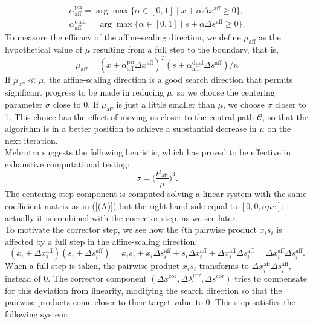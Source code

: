 \documentclass[a4paper,10 pt,titlepage,twoside]{book}
\theoremstyle{plain}
\theoremstyle{definition}
\theoremstyle{remark}
\begin{document}
\begin{align}\label{Qw}\tag{4.22a}
\alpha_{\text{aff}}^{\text{pri}}=\arg\max\{\alpha\in[0,1]\;|\;x +\alpha\Delta x^{\text{aff}}\geq 0\}, \\
\alpha_{\text{aff}}^{\text{dual}}=\arg\max\{\alpha\in[0,1]\;|\;s +\alpha\Delta s^{\text{aff}}\geq 0\}\tag{4.22b}.
\end{align}
To measure the efficacy of the affine-scaling direction, we define $\mu_{\text{aff}}$ as the hypothetical value of $\mu$ resulting from a full step to the boundary, that is,
\begin{equation}\tag{4.22c}
	\mu_{\text{aff}}= (x+\alpha_{\text{aff}}^{\text{pri}}\Delta x^{\text{aff}})^{T}(s+\alpha_{\text{aff}}^{\text{dual}}\Delta s^{\text{aff}})/n
\end{equation}
If $\mu_{\text{aff}}\ll\mu$, the affine-scaling direction is a good search direction that permits significant progress to be made in reducing $\mu$, so we choose the centering parameter $\sigma$ close to 0. If $\mu_{\text{aff}}$ is just a little smaller than $\mu$, we choose $\sigma$ closer to 1. This choice has the effect of moving us closer  to the central path $\mathcal{C}$, so that the algorithm is in a better position to achieve a substantial decrease in $\mu$ on the next iteration.\\
Mehrotra \cite{MER} suggests the following heuristic, which has proved to be effective in exhaustive computational testing:
\begin{equation*}\label{CP}
\sigma = \bigg(\frac{\mu_{\text{aff}}}{\mu}\bigg)^{3}.
\end{equation*}
The centering step component is computed solving a linear system with the same coefficient matrix as in (\ref{(A)}) but the right-hand side equal to $[0, 0,\sigma\mu e]$: actually it is combined with the corrector step, as we see later.\\
To motivate the corrector step, we see how the $i$th pairwise product $x_{i}s_{i}$ is affected by a full step in the affine-scaling direction:
\begin{equation*}
(x_{i}+\Delta x_{i}^{\text{aff}})(s_{i}+\Delta s_{i}^{\text{aff}})= x_{i}s_{i}+ x_{i}\Delta s_{i}^{\text{aff}}+s_{i}\Delta x_{i}^{\text{aff}}+\Delta x_{i}^{\text{aff}}\Delta s_{i}^{\text{aff}} =\Delta x_{i}^{\text{aff}}\Delta s_{i}^{\text{aff}}.
\end{equation*}
When a full step is taken, the pairwise product $x_{i}s_{i}$ transforms to $\Delta x_{i}^{\text{aff}}\Delta s_{i}^{\text{aff}}$, instead of 0. The corrector component $(\Delta x^{\text{cor}}, \Delta \lambda^{\text{cor}}, \Delta s^{\text{cor}})$ tries to compensate for this deviation from linearity, modifying the search direction so that the pairwise products come closer to their target value to 0. This step satisfies the following system:
\end{document}

